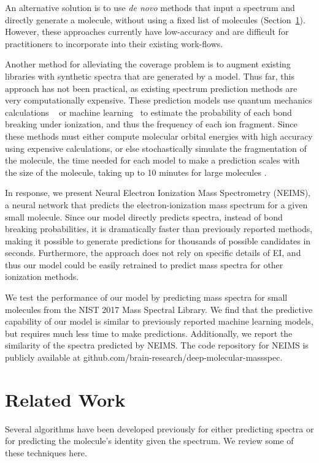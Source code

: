An alternative solution is to use \textit{de novo} methods that input a spectrum and directly generate a molecule, without using a fixed list of molecules (Section~\ref{sec:related-work}). However, these approaches currently have low-accuracy and are difficult for practitioners to incorporate into their existing work-flows.

Another method for alleviating the coverage problem is to augment existing libraries with synthetic spectra that are generated by a model. Thus far, this approach has not been practical, as existing spectrum prediction methods are very computationally expensive. These prediction models use quantum mechanics calculations ~\cite{bauer2016compute,grimme2013towards,Guerra_BEB_model} or machine learning~\cite{allen2016computational} to estimate the probability of each bond breaking under ionization, and thus the frequency of each ion fragment. Since these methods must either compute molecular orbital energies with high accuracy using expensive calculations, or else stochastically simulate the fragmentation of the molecule, the time needed for each model to make a prediction scales with the size of the molecule, taking up to 10 minutes for large molecules \cite{bauer2016compute,allen2016computational}.

In response, we present Neural Electron Ionization Mass Spectrometry (NEIMS), a neural network that predicts the electron-ionization mass spectrum for a given small molecule. Since our model directly predicts spectra, instead of bond breaking probabilities, it is dramatically faster than previously reported methods, making it possible to generate predictions for thousands of possible candidates in seconds. Furthermore, the approach does not rely on specific details of EI, and thus our model could be easily retrained to predict mass spectra for other ionization methods.

We test the performance of our model by predicting mass spectra for small molecules from the NIST 2017 Mass Spectral Library. We find that the predictive capability of our model is similar to previously reported machine learning models, but requires much less time to make predictions. Additionally, we report the similarity of the spectra predicted by NEIMS. The code repository for NEIMS is publicly available at github.com/brain-research/deep-molecular-massspec.

\section{Related Work}
\label{sec:related-work}
Several algorithms have been developed previously for either predicting spectra or for predicting the molecule's identity given the spectrum. We review some of these techniques here.

